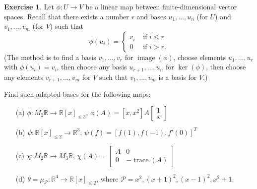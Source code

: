 \documentclass{amsart}
\newcommand{\R}         {{\mathbb{R}}}
\newcommand{\trc}       {\operatorname{trace}}
\newcommand{\img}       {\operatorname{image}}
\newcommand{\bsm}       {\left[\begin{smallmatrix}}
\newcommand{\esm}       {\end{smallmatrix}\right]}
\newcommand{\tht}       {\theta}
\newcommand{\CP}        {{\mathcal{P}}}
\renewcommand{\:}       {\colon}
\theoremstyle{definition}
\newtheorem{exercise}{Exercise}[section]
\begin{document}
\begin{exercise}
 Let $\phi\:U\to V$ be a linear map between
 finite-dimensional vector spaces.  Recall that there exists
 a number $r$ and bases $u_1,\dotsc,u_n$ (for $U$) and
 $v_1,\dotsc,v_m$ (for $V$) such that
 \[ \phi(u_i) = \begin{cases}
     v_i & \text{ if } i \leq r \\
     0   & \text{ if } i > r.
    \end{cases}
 \]
 (The method is to find a basis $v_1,\dotsc,v_r$ for
 $\img(\phi)$, choose elements $u_1,\dotsc,u_r$ with
 $\phi(u_i)=v_i$, then choose any basis $u_{r+1},\dotsc,u_n$
 for $\ker(\phi)$, then choose any elements
 $v_{r+1},\dotsc,v_m$ for $V$ such that $v_1,\dotsc,v_m$ is
 a basis for $V$.)

 Find such adapted bases for the following maps:
 \begin{itemize}
  \item[(a)] $\phi\:M_2\R\to\R[x]_{\leq 3}$,
   $\phi(A)=[x, x^2]A\bsm 1\\ x\esm$
  \item[(b)] $\psi\:\R[x]_{\leq 2}\to\R^3$,
   $\psi(f)=[f(1),f(-1),f'(0)]^T$
  \item[(c)] $\chi\:M_2\R\to M_3\R$,
   $\chi(A)=\left[\begin{array}{c|c} 
    A & 0 \\ \hline 0 & -\trc(A) \end{array}\right]$
  \item[(d)] $\tht=\mu_\CP\:\R^4\to\R[x]_{\leq 2}$,
   where $\CP=x^2,(x+1)^2,(x-1)^2,x^2+1$.
 \end{itemize}
\end{exercise}
\end{document}
